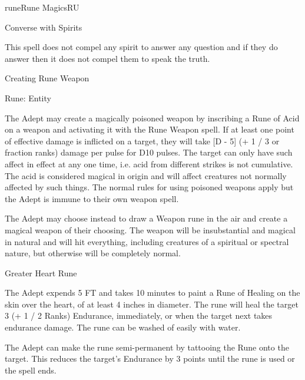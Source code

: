 \begin{College}[2.2]{rune}{Rune Magics}{RU}
\begin{spell}[S-3]{Converse with Spirits}
\begin{effects}
This spell does not compel any spirit to answer any question and if
they do answer then it does not compel them to speak the truth.
\end{effects}
\end{spell}

\begin{spell}[S-4]{Creating Rune Weapon}

Rune: Entity 
\begin{effects}
The Adept may create a magically poisoned weapon by inscribing a Rune
of Acid on a weapon and activating it with the Rune Weapon spell.  If
at least one point of effective damage is inflicted on a target, they
will take [D - 5] (+ 1 / 3 or fraction ranks) damage per pulse for D10
pulses.  The target can only have such affect in effect at any one
time, i.e. acid from different strikes is not cumulative.  The acid is
considered magical in origin and will affect creatures not normally
affected by such things.  The normal rules for using poisoned
weapons apply but the Adept is immune to their own weapon spell.

The Adept may choose instead to draw a Weapon rune in the air and
create a magical weapon of their choosing.  The weapon will be
insubstantial and magical in natural and will hit everything,
including creatures of a spiritual or spectral nature, but otherwise
will be completely normal.
\end{effects}
\end{spell}

\begin{spell}[S-5]{Greater Heart Rune}

\begin{effects}
The Adept expends 5 FT and takes 10 minutes to paint a Rune of Healing
on the skin over the heart, of at least 4 inches in diameter.  The
rune will heal the target 3 (+ 1 / 2 Ranks) Endurance, immediately, or
when the target next takes endurance damage.  The rune can be washed
of easily with water.

The Adept can make the rune semi-permanent by tattooing the Rune onto
the target. This reduces the target’s Endurance by 3 points until the
rune is used or the spell ends.
\end{effects}
\end{spell}


\end{College}
